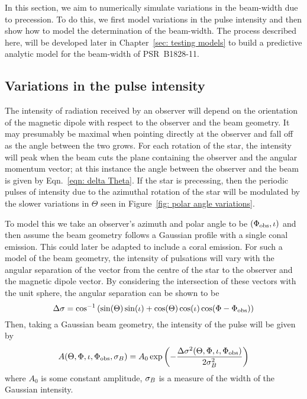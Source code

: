 \documentclass[../full_thesis/full_thesis.tex]{subfiles}
\begin{document}
In this section, we aim to numerically simulate variations in the beam-width
due to precession. To do this, we first model variations in the pulse intensity
and then show how to model the determination of the beam-width. The process
described here, will be developed later in Chapter~\ref{sec: testing models} to
build a predictive analytic model for the beam-width of PSR~B1828-11.

\subsection{Variations in the pulse intensity}

The intensity of radiation received by an observer will depend on the
orientation of the magnetic dipole with respect to the observer and the beam
geometry. It may presumably be maximal when pointing directly at the observer
and fall off as the angle between the two grows. For each rotation of the star,
the intensity will peak when the beam cuts the plane containing the observer
and the angular momentum vector; at this instance the angle between the
observer and the beam is given by Eqn.~\eqref{eqn: delta Theta}. If the star is
precessing, then the periodic pulses of intensity due to the azimuthal rotation
of the star will be modulated by the slower variations in $\Theta$ seen in
Figure~\ref{fig: polar angle variations}.

To model this we take an observer's azimuth and polar angle to be $(\Phi_{\mathrm{obs}},
\iota)$ and then assume the beam geometry follows a Gaussian profile with a
single conal emission.  This could later be adapted to include a coral
emission.  For such a model of the beam geometry, the intensity of pulsations
will vary with the angular separation of the vector from the centre of the star
to the observer and the magnetic dipole vector. By considering the intersection
of these vectors with the unit sphere, the angular separation can be shown to
be
\begin{equation}
\Delta\sigma = \cos^{-1}\left(\sin(\Theta)\sin(\iota) +
                             \cos(\Theta)\cos(\iota)\cos(\Phi - \Phi_{\mathrm{obs}})\right)
\label{eqn: angular sep inv cos}
\end{equation}
Then, taking a Gaussian beam geometry, the intensity of the pulse will be given by
\begin{equation}
A(\Theta, \Phi, \iota, \Phi_{\mathrm{obs}}, \sigma_{B}) =
A_{0} \exp\left(-\frac{\Delta\sigma^{2}(\Theta, \Phi, \iota, \Phi_{\mathrm{obs}})}{2\sigma_{B}^{2}}\right)
\label{eqn: Gaussian beam intensity}
\end{equation}
where $A_{0}$ is some constant amplitude, $\sigma_{B}$ is a measure of the width of
the Gaussian intensity.
\end{document}
